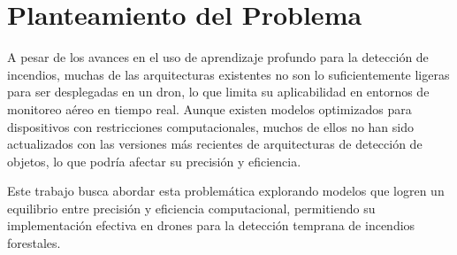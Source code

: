 \section{Planteamiento del Problema}
A pesar de los avances en el uso de aprendizaje profundo para la detección de incendios,
muchas de las arquitecturas existentes no son lo suficientemente ligeras para ser
desplegadas en un dron, lo que limita su aplicabilidad en entornos de monitoreo aéreo
en tiempo real. Aunque existen modelos optimizados para dispositivos con restricciones
computacionales, muchos de ellos no han sido actualizados con las versiones más recientes
de arquitecturas de detección de objetos, lo que podría afectar su precisión y eficiencia.

Este trabajo busca abordar esta problemática explorando modelos que logren un equilibrio
entre precisión y eficiencia computacional, permitiendo su implementación efectiva en drones
para la detección temprana de incendios forestales.